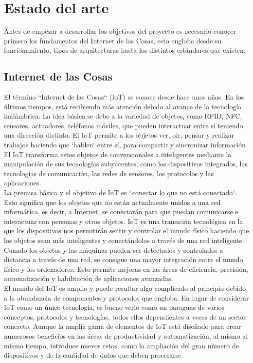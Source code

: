 \chapter{Estado del arte}

{\color{blue}

Antes de empezar a desarrollar los objetivos del proyecto es necesario conocer primero los fundamentos del Internet de las Cosas, esto engloba desde su funcionamiento, tipos de arquitecturas hasta los distintos estándares que existen.

\section{Internet de las Cosas} \label{sec:iot}

El término ``Internet de las Cosas`` (IoT) se conoce desde hace unos años. En los últimos tiempos, está recibiendo más atención debido al avance de la tecnología inalámbrica. La idea básica se debe a la variedad de objetos, como RFID, NFC, sensores, actuadores, teléfonos móviles, que pueden interactuar entre sí teniendo una dirección distinta. El IoT permite a los objetos ver, oír, pensar y realizar trabajos haciendo que `hablen` entre sí, para compartir y sincronizar información. El IoT transforma estos objetos de convencionales a inteligentes mediante la manipulación de sus tecnologías subyacentes, como los dispositivos integrados, las tecnologías de comunicación, las redes de sensores, los protocolos y las aplicaciones. \cite{7589556} \\

La premisa básica y el objetivo de IoT es ``conectar lo que no está conectado``. Esto significa que los objetos que no están actualmente unidos a una red informática, es decir, a Internet, se conectarán para que puedan comunicarse e interactuar con personas y otros objetos. IoT es una transición tecnológica en la que los dispositivos nos permitirán sentir y controlar el mundo físico haciendo que los objetos sean más inteligentes y conectándolos a través de una red inteligente. Cuando los objetos y las máquinas pueden ser detectados y controlados a distancia a través de una red, se consigue una mayor integración entre el mundo físico y los ordenadores. Esto permite mejoras en las áreas de eficiencia, precisión, automatización y habilitación de aplicaciones avanzadas. \\

El mundo del IoT es amplio y puede resultar algo complicado al principio debido a la abundancia de componentes y protocolos que engloba. En lugar de considerar IoT como un único tecnología, es bueno verlo como un paraguas de varios conceptos, protocolos y tecnologías, todos ellos dependientes a veces de un sector concreto. Aunque la amplia gama de elementos de IoT está diseñado para crear numerosos beneficios en las áreas de productividad y automatización, al mismo al mismo tiempo, introduce nuevos retos, como la ampliación del gran número de dispositivos y de la cantidad de datos que deben procesarse. \cite{hanes2017iot}

}
